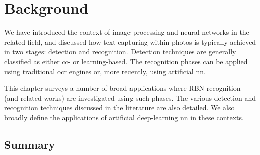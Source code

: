 \chapter{Background}
\label{ch:background}


We have introduced the context of image processing and neural networks in the related field, and discussed how text capturing within photos is typically achieved in two stages: detection and recognition. Detection techniques are generally classified as either \gls{cc}- or learning-based. The recognition phases can be applied using traditional \gls{ocr} engines or, more recently, using artificial \gls{nn}. 

This chapter surveys a number of broad applications where RBN recognition (and related works) are investigated using such phases. The various detection and recognition techniques discussed in the literature are also detailed. We also broadly define the applications of artificial deep-learning \gls{nn} in these contexts.





\section*{Summary}

